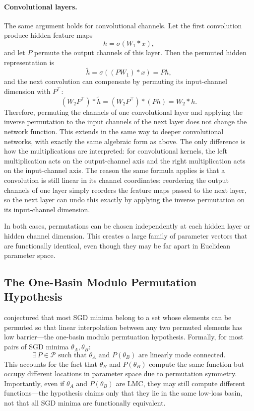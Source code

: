 \documentclass[11pt,a4paper]{report}
\begin{document}
\paragraph{Convolutional layers.}
The same argument holds for convolutional channels. Let the first convolution produce hidden feature maps
\[
h = \sigma(W_1 * x),
\]
and let $P$ permute the output channels of this layer. Then the permuted hidden representation is
\[
\widetilde{h} = \sigma((P W_1) * x) = P h,
\]
and the next convolution can compensate by permuting its input-channel dimension with $P^\top$:
\[
(W_2 P^\top) * \widetilde{h}
=
(W_2 P^\top) * (P h)
=
W_2 * h.
\]
Therefore, permuting the channels of one convolutional layer and applying the inverse permutation to the input channels of the next layer does not change the network function. This extends in the same way to deeper convolutional networks, with exactly the same algebraic form as above. The only difference is how the multiplications are interpreted: for convolutional kernels, the left multiplication acts on the output-channel axis and the right multiplication acts on the input-channel axis. The reason the same formula applies is that a convolution is still linear in its channel coordinates: reordering the output channels of one layer simply reorders the feature maps passed to the next layer, so the next layer can undo this exactly by applying the inverse permutation on its input-channel dimension.

In both cases, permutations can be chosen independently at each hidden layer or hidden channel dimension. This creates a large family of parameter vectors that are functionally identical, even though they may be far apart in Euclidean parameter space.

\subsection{The One-Basin Modulo Permutation Hypothesis}

\citep{entezari2021role} conjectured that most SGD minima belong to a set whose elements can be permuted so that linear interpolation between any two permuted elements has low barrier---the one-basin modulo permtuation hypothesis. Formally, for most pairs of SGD minima $\theta_A, \theta_B$:
\begin{equation}
\exists\, P \in \mathcal{P} \text{ such that } \theta_A \text{ and } P(\theta_B) \text{ are linearly mode connected.}
\end{equation}
This accounts for the fact that $\theta_B$ and $P(\theta_B)$ compute the same function but occupy different locations in parameter space due to permutation symmetry. Importantly, even if $\theta_A$ and $P(\theta_B)$ are LMC, they may still compute different functions---the hypothesis claims only that they lie in the same low-loss basin, not that all SGD minima are functionally equivalent.
\end{document}
